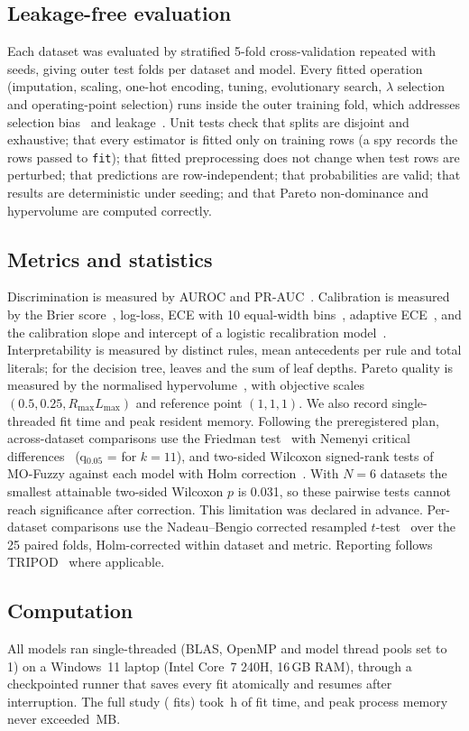 \subsection{Leakage-free evaluation}
Each dataset was evaluated by stratified 5-fold cross-validation repeated with
\resNSeeds{} seeds, giving \resFoldsPerDataset{} outer test folds per dataset and
model. Every fitted operation (imputation, scaling, one-hot encoding, tuning,
evolutionary search, $\lambda$ selection and operating-point selection) runs inside the
outer training fold, which addresses selection bias~\cite{cawley2010} and
leakage~\cite{kaufman2012}. Unit tests check that splits are disjoint and exhaustive;
that every estimator is fitted only on training rows (a spy records the rows passed to
\texttt{fit}); that fitted preprocessing does not change when test rows are
perturbed; that predictions are row-independent; that probabilities are valid; that
results are deterministic under seeding; and that Pareto non-dominance and hypervolume
are computed correctly.

\subsection{Metrics and statistics}
Discrimination is measured by AUROC and PR-AUC~\cite{saito2015}. Calibration is
measured by the Brier score~\cite{brier1950}, log-loss, ECE with 10 equal-width
bins~\cite{naeini2015,guo2017}, adaptive ECE~\cite{nixon2019}, and the calibration slope
and intercept of a logistic recalibration model~\cite{steyerberg2010,vancalster2016,huang2020}.
Interpretability is measured by distinct rules, mean antecedents per rule and total
literals; for the decision tree, leaves and the sum of leaf depths. Pareto quality is
measured by the normalised hypervolume~\cite{zitzler1999}, with objective scales
$(0.5, 0.25, R_{\max}L_{\max})$ and reference point $(1,1,1)$. We also record
single-threaded fit time and peak resident memory.
Following the preregistered plan, across-dataset comparisons use the Friedman
test~\cite{friedman1937} with Nemenyi critical differences~\cite{demsar2006}
(q$_{0.05}$ = \resCDq{} for $k=11$), and two-sided Wilcoxon signed-rank tests of
MO-Fuzzy against each model with Holm correction~\cite{holm1979}. With $N=6$ datasets the
smallest attainable two-sided Wilcoxon $p$ is 0.031, so these pairwise tests cannot
reach significance after correction. This limitation was declared in advance.
Per-dataset comparisons use the Nadeau--Bengio corrected resampled
$t$-test~\cite{nadeau2003} over the 25 paired folds, Holm-corrected within dataset and
metric. Reporting follows TRIPOD~\cite{collins2015} where applicable.

\subsection{Computation}
All models ran single-threaded (BLAS, OpenMP and model thread pools set to 1) on a
Windows~11 laptop (Intel Core~7 240H, 16\,GB RAM), through a checkpointed runner that saves every fit
atomically and resumes after interruption. The full study (\resNFits{} fits) took
\resComputeHours{}\,h of fit time, and peak process memory never exceeded
\resMaxRSS{}\,MB.
